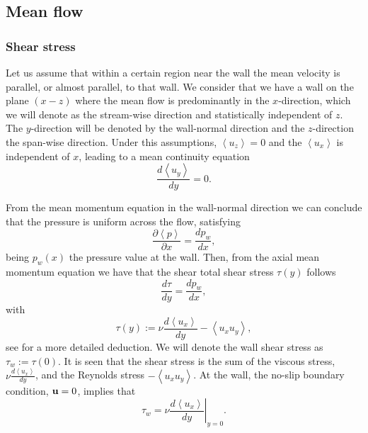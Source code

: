 \subsection{Mean flow}
\subsubsection{Shear stress}
Let us assume that within a certain region near the wall the mean velocity is parallel, or almost parallel, to that wall. We consider that we have a wall on the plane $ (x-z) $ where the mean flow is predominantly in the $ x $-direction, which we will denote as the stream-wise direction and statistically independent of $ z $. The $ y $-direction will be denoted by the wall-normal direction and the $ z $-direction the span-wise direction. Under this assumptions, $ \left\langle u_z\right\rangle=0 $ and the $ \left\langle u_x\right\rangle $ is independent of $ x $, leading to a mean continuity equation
\begin{equation}
\label{eq-mean_continuity}
\frac{d\left\langle u_y\right\rangle}{dy}=0.
\end{equation}

From the mean momentum equation in the wall-normal direction we can conclude that the pressure is uniform across the flow, satisfying $$ \frac{\partial\left\langle p\right\rangle}{\partial x}=\frac{d p_w}{dx}, $$ being $ p_w(x) $ the pressure value at the wall. Then, from the axial mean momentum equation we have that the shear total shear stress $ \tau(y) $ follows
\begin{equation}
\label{eq-shear_stress_law}
\frac{d\tau}{dy}=\frac{d p_w}{dx},
\end{equation}
with
\begin{equation}
\label{eq-shear_stress}
\tau(y):=\nu\frac{d\left\langle u_x\right\rangle}{dy}-\left\langle u_xu_y\right\rangle,
\end{equation}
see \cite{pope_turbulent_2000} for a more detailed deduction. We will denote the wall shear stress as $ \tau_w:=\tau(0) $. It is seen that the shear stress is the sum of the viscous stress, $ \nu\frac{d\left\langle u_x\right\rangle}{dy} $, and the Reynolds stress $ -\left\langle u_xu_y\right\rangle $. At the wall, the no-slip boundary condition, $ {\bf u}=0 $, implies that
\begin{equation}
\label{eq-wall_shear_stress}
\tau_w=\nu\left.\frac{d\left\langle u_x\right\rangle}{dy}\right|_{y=0}.
\end{equation}

